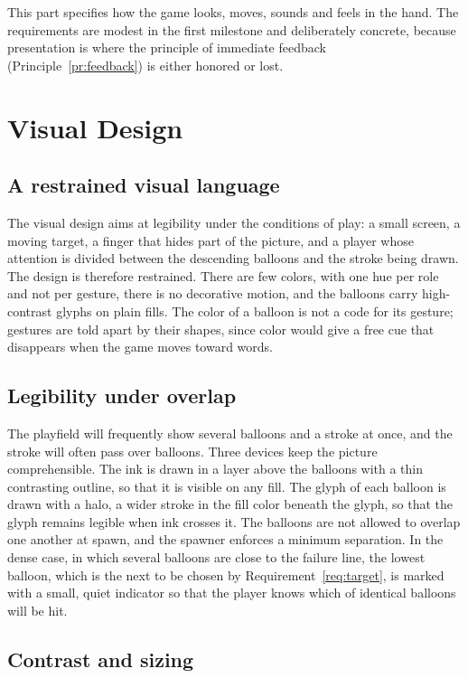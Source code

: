 This part specifies how the game looks, moves, sounds and feels in the hand. The requirements are modest in the first milestone and deliberately concrete, because presentation is where the principle of immediate feedback (Principle~\ref{pr:feedback}) is either honored or lost.

\chapter{Visual Design}\label{ch:visual-design}

\section{A restrained visual language}

The visual design aims at legibility under the conditions of play: a small screen, a moving target, a finger that hides part of the picture, and a player whose attention is divided between the descending balloons and the stroke being drawn. The design is therefore restrained. There are few colors, with one hue per role and not per gesture, there is no decorative motion, and the balloons carry high-contrast glyphs on plain fills. The color of a balloon is not a code for its gesture; gestures are told apart by their shapes, since color would give a free cue that disappears when the game moves toward words.

\section{Legibility under overlap}

The playfield will frequently show several balloons and a stroke at once, and the stroke will often pass over balloons. Three devices keep the picture comprehensible. The ink is drawn in a layer above the balloons with a thin contrasting outline, so that it is visible on any fill. The glyph of each balloon is drawn with a halo, a wider stroke in the fill color beneath the glyph, so that the glyph remains legible when ink crosses it. The balloons are not allowed to overlap one another at spawn, and the spawner enforces a minimum separation. In the dense case, in which several balloons are close to the failure line, the lowest balloon, which is the next to be chosen by Requirement~\ref{req:target}, is marked with a small, quiet indicator so that the player knows which of identical balloons will be hit.

\section{Contrast and sizing}

